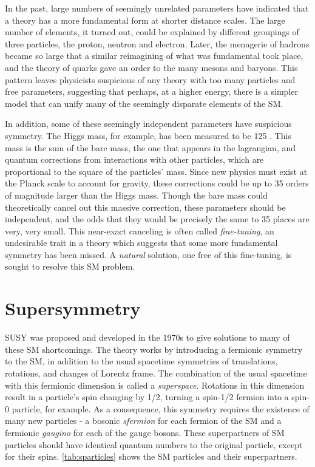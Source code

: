 In the past, large numbers of seemingly unrelated parameters have indicated that a theory has a more fundamental form at shorter distance scales. The large number of elements, it turned out, could be explained by different groupings of three particles, the proton, neutron and electron. Later, the menagerie of hadrons became so large that a similar reimagining of what was fundamental took place, and the theory of quarks gave an order to the many mesons and baryons. This pattern leaves physicists suspicious of any theory with too many particles and free parameters, suggesting that perhaps, at a higher energy, there is a simpler model that can unify many of the seemingly disparate elements of the \ac{SM}. 

In addition, some of these seemingly independent parameters have suspicious symmetry. The Higgs mass, for example, has been measured to be 125 \gev. This mass is the sum of the bare mass, the one that appears in the lagrangian, and quantum corrections from interactions with other particles, which are proportional to the square of the particles' mass. Since new physics must exist at the Planck scale to account for gravity, these corrections could be up to 35 orders of magnitude larger than the Higgs mass. Though the bare mass could theoretically cancel out this massive correction, these parameters should be independent, and the odds that they would be precisely the same to 35 places are very, very small. This near-exact canceling is often called \textit{fine-tuning}, an undesirable trait in a theory which suggests that some more fundamental symmetry has been missed. A \textit{natural} solution, one free of this fine-tuning, is sought to resolve this \ac{SM} problem. 


\section{Supersymmetry}

\acf{SUSY} was proposed and developed in the 1970s to give solutions to many of these \ac{SM} shortcomings. The theory works by introducing a fermionic symmetry to the \ac{SM}, in addition to the usual spacetime symmetries of translations, rotations, and changes of Lorentz frame. The combination of the usual spacetime with this fermionic dimension is called a \textit{superspace}. Rotations in this dimension result in a particle's spin changing by 1/2, turning a spin-1/2 fermion into a spin-0 particle, for example. As a consequence, this symmetry requires the existence of many new particles - a bosonic \textit{sfermion} for each fermion of the \ac{SM} and a fermionic \textit{gaugino} for each of the gauge bosons. These superpartners of \ac{SM} particles should have identical quantum numbers to the original particle, except for their spins. \autoref{tab:sparticles} shows the \ac{SM} particles and their superpartners. 

